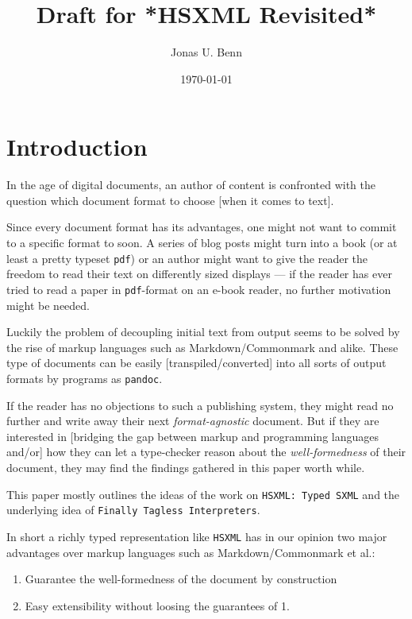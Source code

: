 \documentclass[format=acmsmall, review=true, screen=true]{acmart}
\author{Jonas U. Benn}
\date{\today}
\title[Draft for *HSXML Revisited*]{Draft for *HSXML Revisited*}
\begin{document}
\lstset{language=Haskell}

\maketitle


\section{Introduction}
\label{sec:orgc140eeb}

In the age of digital documents, an author of content is confronted with the
question which document format to choose [when it comes to text].

Since every document format has its advantages, one might not want to commit to
a specific format to soon. A series of blog posts might turn into a book (or at
least a pretty typeset \texttt{pdf}) or an author might want to give the reader the
freedom to read their text on differently sized displays — if the reader has
ever tried to read a paper in \texttt{pdf}-format on an e-book reader, no further
motivation might be needed.

Luckily the problem of decoupling initial text from output seems to be solved by
the rise of markup languages such as Markdown/Commonmark and alike. These type
of documents can be easily [transpiled/converted] into all sorts of output
formats by programs as \texttt{pandoc}.

If the reader has no objections to such a publishing system, they might read no
further and write away their next \emph{format-agnostic} document. But if they are
interested in [bridging the gap between markup and programming languages and/or]
how they can let a type-checker reason about the \emph{well-formedness} of their
document, they may find the findings gathered in this paper worth while.

This paper mostly outlines the ideas of the work on \texttt{HSXML: Typed SXML} and the
underlying idea of \texttt{Finally Tagless Interpreters}.

In short a richly typed representation like \texttt{HSXML} has in our opinion two major
advantages over markup languages such as Markdown/Commonmark et al.:

\begin{enumerate}
\item Guarantee the well-formedness of the document by construction
\item Easy extensibility without loosing the guarantees of 1.
\end{enumerate}
\end{document}
